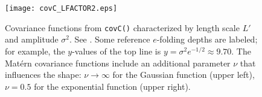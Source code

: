 \documentclass[11pt,titlepage,fleqn]{article}
\begin{document}

\clearpage\pagebreak
\begin{figure}
\centering
\texttt{[image: covC\_LFACTOR2.eps]}
\caption[]
{{
Covariance functions from {\tt covC()} characterized by length scale $L'$ and amplitude $\sigma^2$.
See \citet[][Section 5.3.3, p. 113]{Tarantola2005}.
Some reference $e$-folding depths are labeled; for example, the $y$-values of the top line is $y = \sigma^2 e^{-1/2} \approx 9.70$.
The Mat\'ern covariance functions include an additional parameter $\nu$ that influences the shape: $\nu \rightarrow \infty$ for the Gaussian function (upper left), $\nu = 0.5$ for the exponential function (upper right).
\label{fig:covC2}
}}
\end{figure}

\iffalse
\clearpage\pagebreak
\begin{figure}
\centering
\texttt{[image: covC\_LFACTOR1.eps]}
\caption[]
{{
Same as \refFig{fig:covC2}, but for LFACTOR = 1.
\label{fig:covC1}
}}
\end{figure}
\fi

\end{document}
